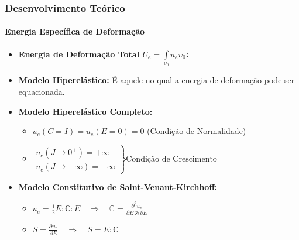 \documentclass{beamer}
\begin{document}
\begin{frame}
    \frametitle{Desenvolvimento Teórico}
        \framesubtitle{Energia Específica de Deformação} 

        \begin{itemize}
            \item \textbf{Energia de Deformação Total \(U_e = \int\limits_{\upsilon_0}{u_e \upsilon_0}\):}
            \item \textbf{Modelo Hiperelástico:} É aquele no qual a energia de deformação pode ser equacionada.
            \item \textbf{Modelo Hiperelástico Completo:} 
            \begin{itemize}
                \item \(u_e(C=I)=u_e(E=0)=0\) (Condição de Normalidade)
                \vspace{1cm} 
                \item \(
                    \left.
                    \begin{aligned}
                        u_e(J\rightarrow 0^+)=+\infty \\
                        u_e(J\rightarrow +\infty)=+\infty
                    \end{aligned}
                    \right\}
                    \text{Condição de Crescimento}
                    \) 
            \end{itemize}
            \item \textbf{Modelo Constitutivo de Saint-Venant-Kirchhoff:}
            \begin{itemize}
                \item \(u_e = \frac{1}{2} E : \mathbb{C} : E  \quad \Rightarrow \quad \mathbb{C} = \frac{\partial^2 u_e}{\partial E \otimes \partial E}\)
                \item \(S=\frac{\partial u_e}{\partial E} \quad \Rightarrow \quad S = E : \mathbb{C}\) 
            \end{itemize}
        \end{itemize}
\end{frame}
\end{document}
